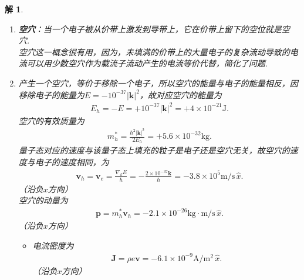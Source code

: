 \documentclass[UTF8,10pt,a4paper]{article}
\theoremstyle{Problem}
\theoremstyle{Solution}
\newtheorem*{sol}{解}
\providecommand{\abs}[1]{\left\lvert#1\right\rvert}
\begin{document}
\begin{sol}
    \begin{enumerate}
        \item[(a)] \textbf{空穴}：当一个电子被从价带上激发到导带上，它在价带上留下的空位就是空穴.\\
        空穴这一概念很有用，因为，未填满的价带上的大量电子的复杂流动导致的电流可以用少数空穴作为载流子流动产生的电流等价代替，简化了问题.
        \item[(b)] 产生一个空穴，等价于移除一个电子，所以空穴的能量与电子的能量相反，因移除电子的能量为$E=-10^{-37}\abs{\bm{k}}^2$，故对应空穴的能量为
        \begin{align}
            E_h=-E=+10^{-37}\abs{\bm{k}}^2=+4\times 10^{-21}\text{J}.
        \end{align}
        空穴的有效质量为
        \begin{align}
            m_h^*=\frac{\hbar^2\abs{\bm{k}}^2}{2E_h}=+5.6\times 10^{-32}\text{kg}.
        \end{align}
        量子态对应的速度与该量子态上填充的粒子是电子还是空穴无关，故空穴的速度与电子的速度相同，为
        \begin{align}
            \bm{v}_h=\bm{v}_e=\frac{\nabla_kE}{\hbar}=-\frac{2\times 10^{-37}\bm{k}}{\hbar}=-3.8\times 10^5\text{m}/\text{s}\,\hat{x}.
        \end{align}
        （沿负$x$方向）\\
        空穴的动量为
        \begin{align}
            \bm{p}=m_h^*\bm{v}_h=-2.1\times 10^{-26}\text{kg}\cdot\text{m}/\text{s}\,\hat{x}.
        \end{align}
        （沿负$x$方向）
        \begin{itemize}
            \item[$\triangleright$] 电流密度为
            \begin{align}
                \bm{J}=\rho e\bm{v}=-6.1\times 10^{-9}\text{A}/\text{m}^2\,\hat{x}.
            \end{align}
            （沿负$x$方向）
        \end{itemize}
    \end{enumerate}
\end{sol}
\end{document}
